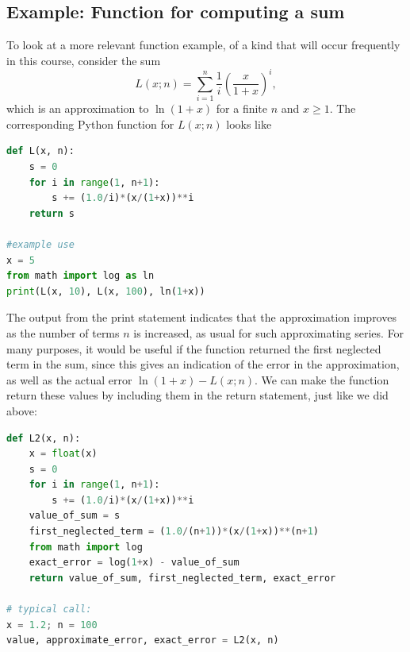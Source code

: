 \documentclass[graybox,envcountchap,sectrefs,final]{svmonodo}
\begin{document}
\subsection{Example: Function for computing a sum}
To look at a more relevant function example, of a kind that will occur frequently in this course, consider the
sum
\[ L(x;n) = \sum_{i=1}^n \frac{1}{i}\left( \frac{x}{1+x}\right)^{i} ,\]
which is an approximation to $\ln (1+x)$ for a finite $n$ and $x\geq 1$. The corresponding Python function for $L(x;n)$ looks like
\begin{lstlisting}[language=Python,style=blue1]
def L(x, n):
    s = 0
    for i in range(1, n+1):
        s += (1.0/i)*(x/(1+x))**i
    return s

#example use
x = 5
from math import log as ln
print(L(x, 10), L(x, 100), ln(1+x))
\end{lstlisting}
The output from the print statement indicates that the approximation improves as the number of terms $n$ is increased,
as usual for such approximating series. For many purposes, it would be useful if the function returned the first
neglected term in the sum, since this gives an indication of the error in the approximation, as well as the actual
error $\ln (1+x) - L(x;n)$. We can make the function return these values by including them in the return
statement, just like we did above:
\begin{lstlisting}[language=Python,style=blue1]
def L2(x, n):
    x = float(x)
    s = 0
    for i in range(1, n+1):
        s += (1.0/i)*(x/(1+x))**i
    value_of_sum = s
    first_neglected_term = (1.0/(n+1))*(x/(1+x))**(n+1)
    from math import log
    exact_error = log(1+x) - value_of_sum
    return value_of_sum, first_neglected_term, exact_error

# typical call:
x = 1.2; n = 100
value, approximate_error, exact_error = L2(x, n)
\end{lstlisting}


\end{document}
